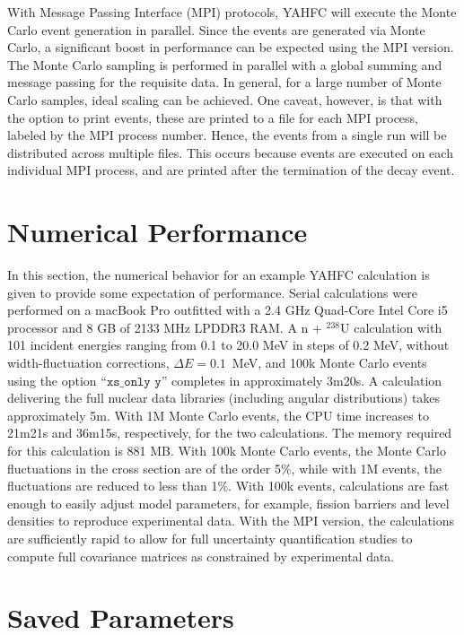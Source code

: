 \documentclass[
10pt,
showpacs,preprintnumbers,footinbib,
amsfonts,amsmath,amssymb,
aps,
prc,twocolumn,groupedaddress,superscriptaddress,
showkeys,
nofootinbib
]{revtex4-1}
\begin{document}
With Message Passing Interface (MPI) protocols, YAHFC will execute the Monte Carlo event generation in parallel. Since the events are generated via Monte Carlo, a significant boost in performance can be expected using the MPI version. The Monte Carlo sampling is performed in parallel with a global summing and message passing for the requisite data. In general, for a large number of Monte Carlo samples, ideal scaling can be achieved. One caveat, however, is that with the option to print events, these are printed to a file for each MPI process, labeled by the MPI process number. Hence, the events from a single run will be distributed across multiple files. This occurs because events are executed on each individual MPI process, and are printed after the termination of the decay event. 

\section{Numerical Performance}
In this section, the numerical behavior for an example YAHFC calculation is given to provide some expectation of performance. Serial calculations were performed on a macBook Pro outfitted with a 2.4 GHz Quad-Core Intel Core i5 processor and 8 GB of 2133 MHz LPDDR3 RAM. A n + $^{238}$U calculation with 101 incident energies ranging from 0.1 to 20.0 MeV in steps of 0.2 MeV, without width-fluctuation corrections, $\Delta E = 0.1$~MeV, and 100k Monte Carlo events using the option ``${\texttt{xs\_only y}}$'' completes in approximately 3m20s. A calculation delivering the full nuclear data libraries (including angular distributions) takes approximately 5m. With 1M Monte Carlo events, the CPU time increases to 21m21s and 36m15s, respectively, for the two calculations. The memory required for this calculation is 881 MB. With 100k Monte Carlo events, the Monte Carlo fluctuations in the cross section are of the order 5\%, while with 1M events, the fluctuations are reduced to less than 1\%. With 100k events, calculations are fast enough to easily adjust model parameters, for example, fission barriers and level densities to reproduce experimental data. With the MPI version, the calculations are sufficiently rapid to allow for full uncertainty quantification studies to compute full covariance matrices as constrained by experimental data.

\section{Saved Parameters}
\end{document}
